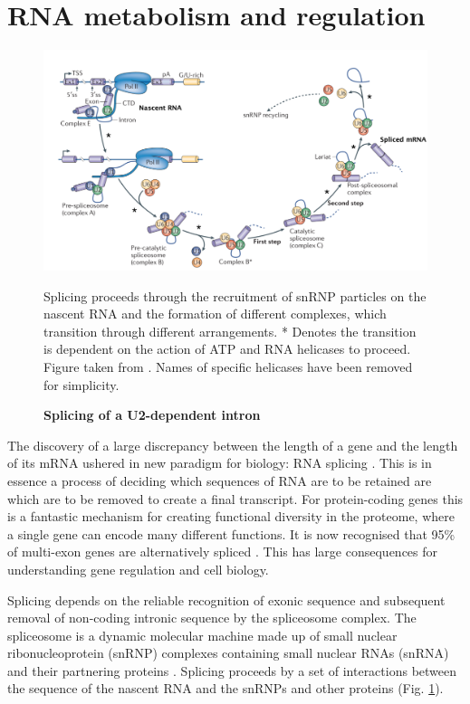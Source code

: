 \section{RNA metabolism and regulation}

\begin{figure}[h!]
	\centering
	\includegraphics[width=\textwidth]{Figures/01_introduction/splicing.png}
	\caption{\textbf{Splicing of a U2-dependent intron} }
	Splicing proceeds through the recruitment of snRNP particles on the nascent RNA and the formation of different complexes, which transition through different arrangements. 
	* Denotes the transition is dependent on the action of ATP and RNA helicases to proceed.
	Figure taken from \citep{Matera2014}. Names of specific helicases have been removed for simplicity.
	\label{fig:intro_splicing}
\end{figure}

The discovery of a large discrepancy between the length of a gene and the length of its mRNA ushered in new paradigm for biology: RNA splicing \citep{Berget1977,Chow1977}.
This is in essence a process of deciding which sequences of RNA are to be retained are which are to be removed to create a final transcript.
For protein-coding genes this is a fantastic mechanism for creating functional diversity in the proteome, where a single gene can encode many different functions.
It is now recognised that 95\% of multi-exon genes are alternatively spliced \citep{Pan2008,Wang2008}. This has large consequences for understanding gene regulation and cell biology.

Splicing depends on the reliable recognition of exonic sequence and subsequent removal of non-coding intronic sequence by the spliceosome complex. 
The spliceosome is a dynamic molecular machine made up of small nuclear ribonucleoprotein (snRNP) complexes containing small nuclear RNAs (snRNA) and their partnering proteins \citep{Matera2014}. 
Splicing proceeds by a set of interactions between the sequence of the nascent RNA and the snRNPs and other proteins (Fig. \ref{fig:intro_splicing}).

